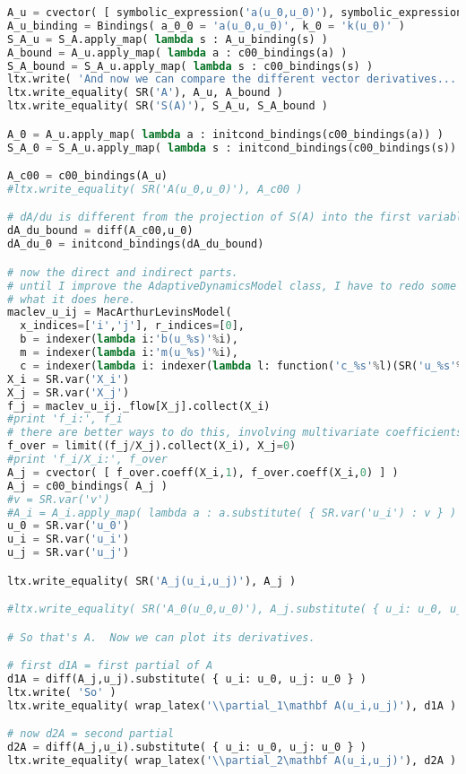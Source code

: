 \begin{lstlisting}[language=Python]
A_u = cvector( [ symbolic_expression('a(u_0,u_0)'), symbolic_expression('k(u_0)') ] )
A_u_binding = Bindings( a_0_0 = 'a(u_0,u_0)', k_0 = 'k(u_0)' )
S_A_u = S_A.apply_map( lambda s : A_u_binding(s) )
A_bound = A_u.apply_map( lambda a : c00_bindings(a) )
S_A_bound = S_A_u.apply_map( lambda s : c00_bindings(s) )
ltx.write( 'And now we can compare the different vector derivatives...' )
ltx.write_equality( SR('A'), A_u, A_bound )
ltx.write_equality( SR('S(A)'), S_A_u, S_A_bound )

A_0 = A_u.apply_map( lambda a : initcond_bindings(c00_bindings(a)) )
S_A_0 = S_A_u.apply_map( lambda s : initcond_bindings(c00_bindings(s)) )

A_c00 = c00_bindings(A_u)
#ltx.write_equality( SR('A(u_0,u_0)'), A_c00 )

# dA/du is different from the projection of S(A) into the first variable.
dA_du_bound = diff(A_c00,u_0)
dA_du_0 = initcond_bindings(dA_du_bound)

# now the direct and indirect parts.
# until I improve the AdaptiveDynamicsModel class, I have to redo some of
# what it does here.
maclev_u_ij = MacArthurLevinsModel(
  x_indices=['i','j'], r_indices=[0],
  b = indexer(lambda i:'b(u_%s)'%i),
  m = indexer(lambda i:'m(u_%s)'%i),
  c = indexer(lambda i: indexer(lambda l: function('c_%s'%l)(SR('u_%s'%i)))) )
X_i = SR.var('X_i')
X_j = SR.var('X_j')
f_j = maclev_u_ij._flow[X_j].collect(X_i)
#print 'f_i:', f_i
# there are better ways to do this, involving multivariate coefficients
f_over = limit((f_j/X_j).collect(X_i), X_j=0)
#print 'f_i/X_i:', f_over
A_j = cvector( [ f_over.coeff(X_i,1), f_over.coeff(X_i,0) ] )
A_j = c00_bindings( A_j )
#v = SR.var('v')
#A_i = A_i.apply_map( lambda a : a.substitute( { SR.var('u_i') : v } ) )
u_0 = SR.var('u_0')
u_i = SR.var('u_i')
u_j = SR.var('u_j')

ltx.write_equality( SR('A_j(u_i,u_j)'), A_j )

#ltx.write_equality( SR('A_0(u_0,u_0)'), A_j.substitute( { u_i: u_0, u_j: u_0 } ) )

# So that's A.  Now we can plot its derivatives.

# first d1A = first partial of A
d1A = diff(A_j,u_j).substitute( { u_i: u_0, u_j: u_0 } )
ltx.write( 'So' )
ltx.write_equality( wrap_latex('\\partial_1\mathbf A(u_i,u_j)'), d1A )

# now d2A = second partial
d2A = diff(A_j,u_i).substitute( { u_i: u_0, u_j: u_0 } )
ltx.write_equality( wrap_latex('\\partial_2\mathbf A(u_i,u_j)'), d2A )


\end{lstlisting}
